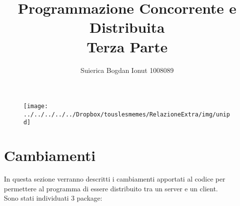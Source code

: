 \documentclass[13pt]{article}
\title{Programmazione Concorrente e Distribuita\\Terza Parte}
\author{Suierica Bogdan Ionut 1008089}
\begin{document}
\maketitle

\begin{figure}[h]
\centering
\texttt{[image: ../../../../../Dropbox/touslesmemes/RelazioneExtra/img/unipd]}
\label{fig:unipd}
\end{figure}

\newpage
\section{Cambiamenti}
In questa sezione verranno descritti i cambiamenti apportati al codice per permettere al programma di essere distribuito tra un server e un client.\\
Sono stati individuati 3 package:
\end{document}

